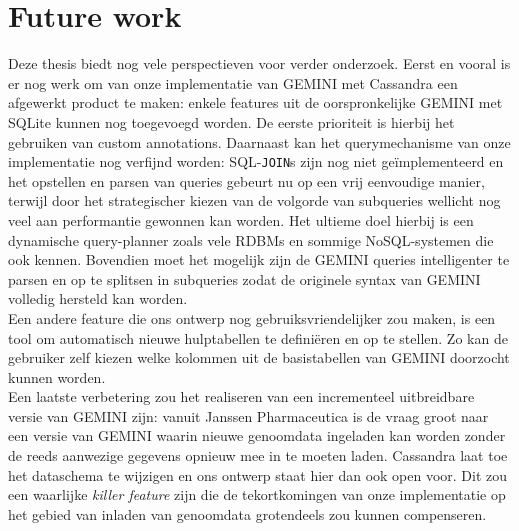 \chapter{Future work}

Deze thesis biedt nog vele perspectieven voor verder onderzoek. Eerst en vooral is er nog werk om van onze implementatie van GEMINI met Cassandra een afgewerkt product te maken: enkele features uit de oorspronkelijke GEMINI met SQLite kunnen nog toegevoegd worden. De eerste prioriteit is hierbij het gebruiken van custom annotations. Daarnaast kan het querymechanisme van onze implementatie nog verfijnd worden: SQL-\texttt{JOIN}s zijn nog niet ge\"implementeerd en het opstellen en parsen van queries gebeurt nu op een vrij eenvoudige manier, terwijl door het strategischer kiezen van de volgorde van subqueries wellicht nog veel aan performantie gewonnen kan worden. Het ultieme doel hierbij is een dynamische query-planner zoals vele RDBMs en sommige NoSQL-systemen die ook kennen. Bovendien moet het mogelijk zijn de GEMINI queries intelligenter te parsen en op te splitsen in subqueries zodat de originele syntax van GEMINI volledig hersteld kan worden.\\
Een andere feature die ons ontwerp nog gebruiksvriendelijker zou maken, is een tool om automatisch nieuwe hulptabellen te defini\"eren en op te stellen. Zo kan de gebruiker zelf kiezen welke kolommen uit de basistabellen van GEMINI doorzocht kunnen worden.\\
Een laatste verbetering zou het realiseren van een incrementeel uitbreidbare versie van GEMINI zijn: vanuit Janssen Pharmaceutica is de vraag groot naar een versie van GEMINI waarin nieuwe genoomdata ingeladen kan worden zonder de reeds aanwezige gegevens opnieuw mee in te moeten laden. Cassandra laat toe het dataschema te wijzigen en ons ontwerp staat hier dan ook open voor. Dit zou een waarlijke \textit{killer feature} zijn die de tekortkomingen van onze implementatie op het gebied van inladen van genoomdata grotendeels zou kunnen compenseren.\\

